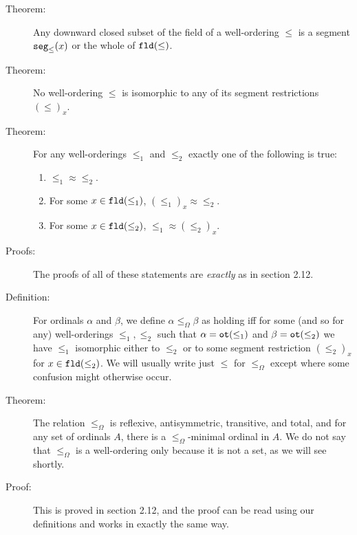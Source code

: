 \documentclass[12pt]{book}
\begin{document}
\begin{description}


\item[Theorem:]  Any downward closed subset of the field of a well-ordering $\leq$ is a segment ${\tt seg}_{\leq}(x)$ or the whole of ${\tt fld}(\leq)$.

\item[Theorem:]  No well-ordering $\leq$ is isomorphic to any of its segment restrictions $(\leq)_x$.

\newpage

\item[Theorem:]  For any well-orderings $\leq_1$ and $\leq_2$ exactly one of the following is true:

\begin{enumerate}

\item  $\leq_1 \approx \leq_2$.

\item  For some $x \in {\tt fld}(\leq_1)$, $(\leq_1)_x \approx \leq_2$.

\item  For some $x \in {\tt fld}(\leq_2)$, $\leq_1 \approx (\leq_2)_x$.

\end{enumerate}

\item[Proofs:]  The proofs of all of these statements are {\em exactly\/} as in section 2.12.

\item[Definition:]  For ordinals $\alpha$ and $\beta$, we define $\alpha \leq_{\Omega} \beta$ as holding iff for some (and so for any) well-orderings $\leq_1, \leq_2$ such that
$\alpha = {\tt ot}(\leq_1)$ and $\beta = {\tt ot}(\leq_2)$ we have $\leq_1$ isomorphic either to $\leq_2$ or to some segment restriction $(\leq_2)_x$ for $x \in {\tt fld}(\leq_2)$.
We will usually write just $\leq$ for $\leq_{\Omega}$ except where some confusion might otherwise occur.

\item[Theorem:]  The relation $\leq_{\Omega}$ is reflexive, antisymmetric, transitive, and total, and for any set of ordinals $A$, there is a $\leq_{\Omega}$-minimal ordinal in $A$.  We do not say that $\leq_{\Omega}$ is a well-ordering only because it is not a set, as we will see shortly.

\item[Proof:]  This is proved in section 2.12, and the proof can be read using our definitions and works in exactly the same way.


\end{description}
\end{document}
